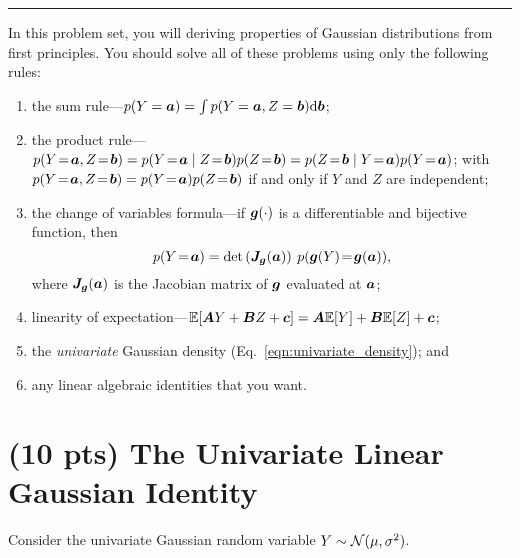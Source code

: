 \documentclass[11pt,letterpaper]{article}
\newcommand{\sectionbreak}{%
  \vspace{1em}
  \hrule
}
\begin{document}
\sectionbreak

In this problem set, you will deriving properties of Gaussian distributions from first principles.
You should solve all of these problems using only the following rules:
\begin{enumerate}
  \item the sum rule---$p(Y={\bm{a}}) = \int p(Y={\bm{a}}, Z={\bm{b}}) \textrm{d} {\bm{b}}$;
  \item the product rule---$p(Y\!=\!\va, Z\!=\!\vb) = p(Y\!=\!\va \mid Z\!=\!\vb) p(Z\!=\!\vb) = p(Z\!=\!\vb \mid Y\!=\!\va) p(Y\!=\!\va)$;
    with $p(Y\!=\!\va, Z\!=\!\vb) = p(Y\!=\!\va) p(Z\!=\!\vb)$ if and only if $Y$ and $Z$ are independent;
  \item the change of variables formula---if ${\bm{g}}(\cdot)$ is a differentiable and bijective function, then
    $$p(Y\!=\!{\bm{a}}) = \det \left( {\bm{J}}_{{\bm{g}}}({\bm{a}}) \right) \: p({\bm{g}}(Y)\!=\!{\bm{g}}({\bm{a}})),$$
    where ${\bm{J}}_{\bm{g}}({\bm{a}})$ is the Jacobian matrix of ${\bm{g}}$ evaluated at ${\bm{a}}$;
  \item linearity of expectation---$\mathbb{E}[ {\bm{A}} Y + {\bm{B}} Z + {\bm{c}} ] = {\bm{A}} \mathbb{E}[Y] + {\bm{B}} \mathbb{E}[Z] + {\bm{c}}$;
  \item the \emph{univariate} Gaussian density (Eq.~\ref{eqn:univariate_density}); and
  \item any linear algebraic identities that you want.
\end{enumerate}


\clearpage

\section{(10 pts) The Univariate Linear Gaussian Identity}

Consider the univariate Gaussian random variable $Y \sim \mathcal{N}(\mu, \sigma^2)$.
\end{document}
